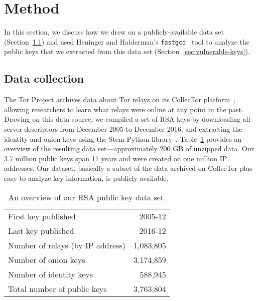 \section{Method}
\label{sec:method}
In this section, we discuss how we drew on a publicly-available data set
(Section~\ref{sec:data-collection}) and used Heninger and Halderman's 
\texttt{fastgcd}~\cite{fastgcd} tool to analyze the public keys that 
we extracted from this data set (Section~\ref{sec:vulnerable-keys}).

\subsection{Data collection}
\label{sec:data-collection}
The Tor Project archives data about Tor relays on its CollecTor
platform~\cite{collector}, allowing researchers to learn what relays were online
at any point in the past.  Drawing on this data source, we compiled a set of RSA
keys by downloading all server descriptors from December 2005 to December 2016,
and extracting the identity and onion keys using the Stem Python
library~\cite{stem}.  Table~\ref{tab:dataset} provides an overview of the
resulting data set---approximately 200 GB of unzipped data.  Our 3.7 million
public keys span 11 years and were created on one million IP addresses.
Our dataset, basically a subset of the data archived on CollecTor plus
easy-to-analyze key information, is publicly available.

\begin{table}[t]
	\centering
	\begin{tabular}{l r}
	First key published & 2005-12 \\
	Last key published & 2016-12 \\

	\midrule

	Number of relays (by IP address) & 1,083,805 \\
	Number of onion keys & 3,174,859 \\
	Number of identity keys & 588,945 \\
	Total number of public keys & 3,763,804 \\
	\end{tabular}
	\caption{An overview of our RSA public key data set.}
	\label{tab:dataset}
\end{table}


